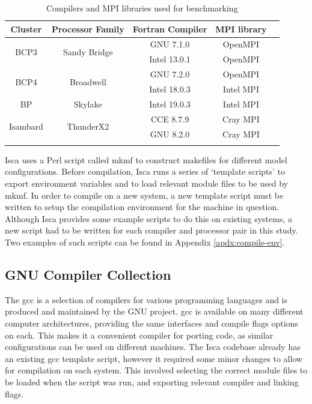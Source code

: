\documentclass[a4paper,11pt]{report}
\begin{document}
\begin{table}[htp]
\caption{Compilers and MPI libraries used for benchmarking}
\begin{center}
\begin{tabular}{c c c c c}
 \toprule

\textbf{Cluster} 			&	\textbf{Processor Family}		&	\textbf{Fortran Compiler}		&	\textbf{MPI library}	 \\
\midrule
\multirow{2}{*}{BCP3} 	&	\multirow{2}{*}{Sandy Bridge}	&	GNU 7.1.0 			&	OpenMPI	 \\
					& 							& 	Intel 13.0.1			&	OpenMPI			\\
\midrule	
\multirow{2}{*}{BCP4}	&	\multirow{2}{*}{Broadwell}		&	GNU 7.2.0			&	OpenMPI			\\
	&											&	Intel 18.0.3			&	Intel MPI			\\
\midrule	
BP					&	Skylake					&	Intel 19.0.3 			&	Intel MPI			\\
\midrule			
\multirow{2}{*}{Isambard}	&	\multirow{2}{*}{ThunderX2}	&	CCE 8.7.9				&	Cray MPI			\\
					&							&	GNU 8.2.0			&	Cray MPI			\\
\bottomrule \\
\end{tabular}	
\end{center}
\label{tbl:compilers}
\end{table}%
\par
Isca uses a Perl script called \gls{mkmf} to construct makefiles for different model configurations. Before compilation, Isca runs a series of `template scripts' to export environment variables and to load relevant module files to be used by \gls{mkmf}. In order to compile on a new system, a new template script must be written to setup the compilation environment for the machine in question. Although Isca provides some example scripts to do this on existing systems, a new script had to be written for each compiler and processor pair in this study. Two examples of such scripts can be found in Appendix \ref{apdx:compile-env}.  

\subsection{GNU Compiler Collection}
The \gls{gcc} is a selection of compilers for various programming languages and is produced and maintained by the GNU project. \gls{gcc} is available on many different computer architectures, providing the same interfaces and compile flags options on each. This makes it a convenient compiler for porting code, as similar configurations can be used on different machines. The Isca codebase already has an existing \gls{gcc} template script, however it required some minor changes to allow for compilation on each system. This involved selecting the correct module files to be loaded when the script was run, and exporting relevant compiler and linking flags.
\end{document}
